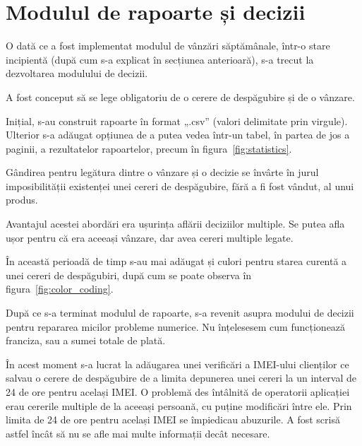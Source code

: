 \section{Modulul de rapoarte și decizii}

	O dată ce a fost implementat modulul de vânzări săptămânale, într-o stare incipientă (după cum s-a explicat în secțiunea anterioară), s-a trecut la dezvoltarea modulului de decizii.

	A fost conceput să se lege obligatoriu de o cerere de despăgubire și de o vânzare.

	Inițial, s-au construit rapoarte în format „.csv” (valori delimitate prin virgule).
	Ulterior s-a adăugat opțiunea de a putea vedea într-un tabel, în partea de jos a paginii, a rezultatelor rapoartelor, precum în figura~\ref{fig:statistics}.

	Gândirea pentru legătura dintre o vânzare și o decizie se învârte în jurul imposibilității existenței unei cereri de despăgubire, fără a fi fost vândut, al unui produs.

	Avantajul acestei abordări era ușurința aflării deciziilor multiple.
	Se putea afla ușor pentru că era aceeași vânzare, dar avea cereri multiple legate.

	În această perioadă de timp s-au mai adăugat și culori pentru starea curentă a unei cereri de despăgubiri, după cum se poate observa în figura~\ref{fig:color_coding}.

	După ce s-a terminat modulul de rapoarte, s-a revenit asupra modului de decizii pentru repararea micilor probleme numerice.
	Nu înțelesesem cum funcționează franciza, sau a sumei totale de plată.

	În acest moment s-a lucrat la adăugarea unei verificări a IMEI-ului clienților ce salvau o cerere de despăgubire de a limita depunerea unei cereri la un interval de 24 de ore pentru același IMEI.
	O problemă des întâlnită de operatorii aplicației erau cererile multiple de la aceeași persoană, cu puține modificări între ele.
	Prin limita de 24 de ore pentru același IMEI se împiedicau abuzurile.
	A fost scrisă astfel încât să nu se afle mai multe informații decât necesare.
